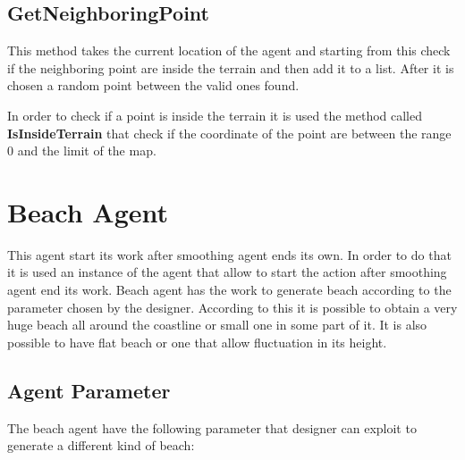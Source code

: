 \documentclass[12pt]{article}
\begin{document}
    \subsection{GetNeighboringPoint}
    This method takes the current location of the agent and starting from this check if the neighboring point are inside the terrain and then add it to a list. After it is chosen a 
    random point between the valid ones found.

    In order to check if a point is inside the terrain it is used the method called \textbf{IsInsideTerrain} that check if the coordinate of the point are between the range 0 and
    the limit of the map.

    \section{Beach Agent}
    This agent start its work after smoothing agent ends its own. In order to do that it is used an instance of the agent that allow to start the action after smoothing agent end its work.
    Beach agent has the work to generate beach according to the parameter chosen by the designer.
    According to this it is possible to obtain a very huge beach all around the coastline or small one in some part of it. It is also possible
    to have flat beach or one that allow fluctuation in its height.

    \subsection{Agent Parameter}
    The beach agent have the following parameter that designer can exploit to generate a different kind of beach:
\end{document}
